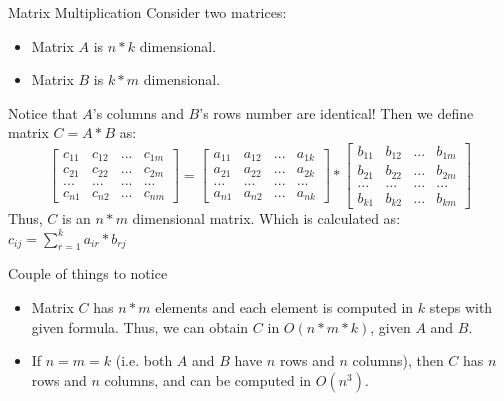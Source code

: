 \documentclass{beamer}
\begin{document}
\begin{frame}{Matrix Multiplication}
	Consider two matrices:
	\begin{itemize}
		\item Matrix $A$ is $n * k$ dimensional.
		\item Matrix $B$ is $k * m$ dimensional.
	\end{itemize}
	Notice that $A$'s columns and $B$'s rows number are identical!
	\newline \newline
	Then we define matrix $C = A * B$ as:
	\newline
	 \[
	 \left[ {\begin{array}{cccc}
       c_{11} & c_{12} & ... & c_{1m} \\
       c_{21} & c_{22} & ... & c_{2m} \\
         ...   &   ...   & ... &   ...   \\
       c_{n1} & c_{n2} & ... & c_{nm}
      \end{array} } \right]
      =
      \left[ {\begin{array}{cccc}
       a_{11} & a_{12} & ... & a_{1k} \\
       a_{21} & a_{22} & ... & a_{2k} \\
         ...   &   ...   & ... &   ...   \\
       a_{n1} & a_{n2} & ... & a_{nk}
      \end{array} } \right]
      *
      \left[ {\begin{array}{cccc}
       b_{11} & b_{12} & ... & b_{1m} \\
       b_{21} & b_{22} & ... & b_{2m} \\
         ...   &   ...   & ... &   ...   \\
       b_{k1} & b_{k2} & ... & b_{km}
      \end{array} } \right]
    \]
    \newline
    Thus, $C$ is an $n * m$ dimensional matrix.
    \newline 
    Which is calculated as: 
    $c_{ij} = \sum\limits_{r=1}^k a_{ir} * b_{rj}$
\end{frame}

\begin{frame}{Couple of things to notice}
	\begin{itemize}
	    \item 
    	    Matrix $C$ has $n * m$ elements and each element is computed in $k$ steps with given formula.
    	    \newline
    	    Thus, we can obtain $C$ in $O(n * m * k)$, given $A$ and $B$.
    	
	    \item
	        If $n = m = k$ (i.e. both $A$ and $B$ have $n$ rows and $n$ columns), 
	        \newline 
	        then $C$ has $n$ rows and $n$ columns, and can be computed in $O(n^3)$.
	\end{itemize}
\end{frame}
\end{document}

